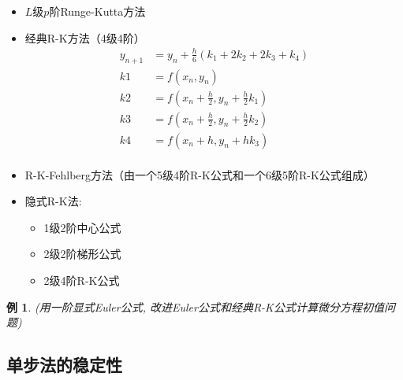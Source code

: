 \documentclass[twoside]{article}
\newtheorem{eg}{例}[section]
\begin{document}
\begin{itemize}
  \item $L$级$p$阶Runge-Kutta方法
  \item 经典R-K方法（4级4阶）
    \begin{equation}
      \begin{aligned}
        y_{n+1} &= y_n + \frac{h}{6} (k_1 + 2k_2 + 2k_3 + k_4) \\
        k1 &=f(x_n, y_n) \\
        k2 &=f(x_n + \frac{h}{2}, y_n + \frac{h}{2} k_1) \\
        k3 &=f(x_n + \frac{h}{2}, y_n + \frac{h}{2} k_2) \\
        k4 &=f(x_n + h, y_n + h k_3) \\
      \end{aligned}
    \end{equation}
  \item R-K-Fehlberg方法（由一个5级4阶R-K公式和一个6级5阶R-K公式组成）
  \item 隐式R-K法:
    \begin{itemize}
      \item 1级2阶中心公式
      \item 2级2阶梯形公式
      \item 2级4阶R-K公式
    \end{itemize}
\end{itemize}
\begin{eg}
  (用一阶显式Euler公式, 改进Euler公式和经典R-K公式计算微分方程初值问题)
\end{eg}
\subsection{单步法的稳定性}
\end{document}
